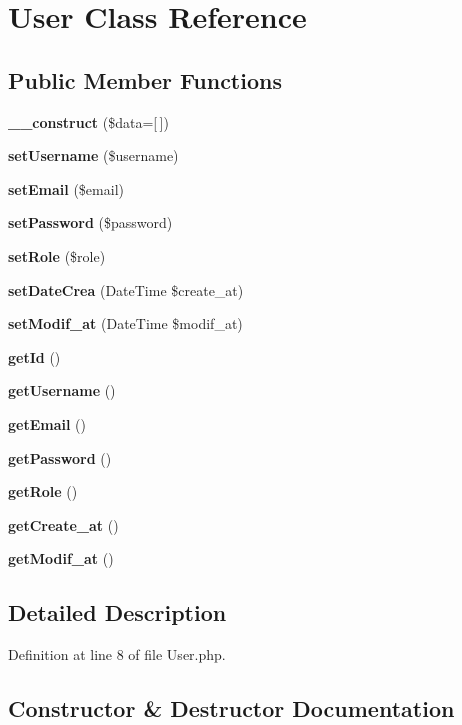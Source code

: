 \section{User Class Reference}
\label{class_src_1_1_entity_1_1_user}
\subsection*{Public Member Functions}
\begin{DoxyCompactItemize}
\item 
\textbf{ \+\_\+\+\_\+construct} (\$data=[$\,$])
\item 
\textbf{ set\+Username} (\$username)
\item 
\textbf{ set\+Email} (\$email)
\item 
\textbf{ set\+Password} (\$password)
\item 
\textbf{ set\+Role} (\$role)
\item 
\textbf{ set\+Date\+Crea} (Date\+Time \$create\+\_\+at)
\item 
\textbf{ set\+Modif\+\_\+at} (Date\+Time \$modif\+\_\+at)
\item 
\textbf{ get\+Id} ()
\item 
\textbf{ get\+Username} ()
\item 
\textbf{ get\+Email} ()
\item 
\textbf{ get\+Password} ()
\item 
\textbf{ get\+Role} ()
\item 
\textbf{ get\+Create\+\_\+at} ()
\item 
\textbf{ get\+Modif\+\_\+at} ()
\end{DoxyCompactItemize}


\subsection{Detailed Description}


Definition at line 8 of file User.\+php.



\subsection{Constructor \& Destructor Documentation}
\mbox{\label{class_src_1_1_entity_1_1_user_ab3129f1d71e9f51353de9d551ea381d7}} 
